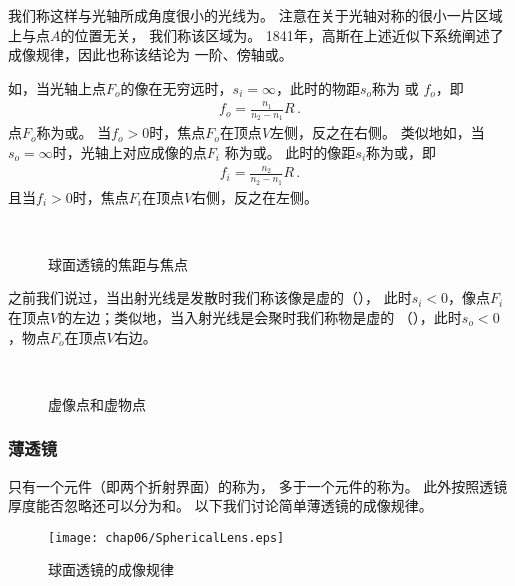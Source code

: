 我们称这样与光轴所成角度很小的光线为。
注意在关于光轴对称的很小一片区域上与点$A$的位置无关，
我们称该区域为。
1841年，高斯在上述近似下系统阐述了成像规律，因此也称该结论为
一阶、傍轴或。

如，当光轴上点$F_o$的像在无穷远时，$s_i=\infty$，此时的物距$s_o$称为
或
$f_o$，即
\begin{align}
    f_o=\frac{n_1}{n_2-n_1}R\, .
\end{align}
点$F_o$称为或。
当$f_o>0$时，焦点$F_o$在顶点$V$左侧，反之在右侧。
类似地如，当$s_o=\infty$时，光轴上对应成像的点$F_i$
称为或。
此时的像距$s_i$称为或，即
\begin{align}
    f_i=\frac{n_2}{n_2-n_1}R\, .
\end{align}
且当$f_i>0$时，焦点$F_i$在顶点$V$右侧，反之在左侧。
\begin{figure}[htbp]
    \centering
    \,\,
    \caption{球面透镜的焦距与焦点}
    \label{fig:6.32}
\end{figure}

之前我们说过，当出射光线是发散时我们称该像是虚的（），
此时$s_i<0$，像点$F_i$在顶点$V$的左边；类似地，当入射光线是会聚时我们称物是虚的
（），此时$s_o<0$，物点$F_o$在顶点$V$右边。
\begin{figure}[htbp]
    \centering
    \,\,\,
    \caption{虚像点和虚物点}
    \label{fig:6.33}
\end{figure}

\subsubsection{薄透镜}
只有一个元件（即两个折射界面）的称为，
多于一个元件的称为。
此外按照透镜厚度能否忽略还可以分为和。
以下我们讨论简单薄透镜的成像规律。
\begin{figure}[htbp]
    \centering\texttt{[image: chap06/SphericalLens.eps]}
    \caption{球面透镜的成像规律}
    \label{fig:6.34}
\end{figure}

